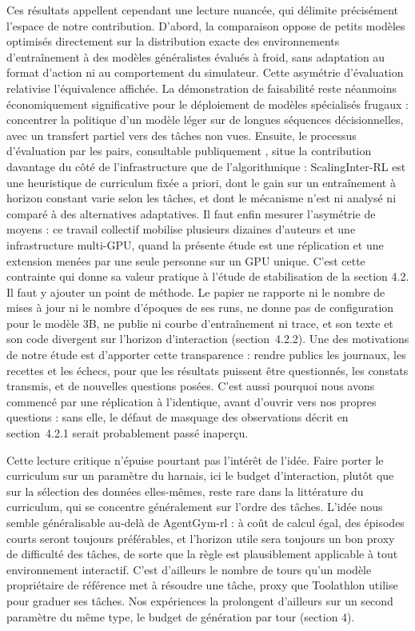 \documentclass[11pt,a4paper]{article}
\begin{document}
Ces résultats appellent cependant une lecture nuancée, qui délimite précisément l'espace de notre contribution. D'abord, la comparaison oppose de petits modèles optimisés directement sur la distribution exacte des environnements d'entraînement à des modèles généralistes évalués à froid, sans adaptation au format d'action ni au comportement du simulateur. Cette asymétrie d'évaluation relativise l'équivalence affichée. La démonstration de faisabilité reste néanmoins économiquement significative pour le déploiement de modèles spécialisés frugaux : concentrer la politique d'un modèle léger sur de longues séquences décisionnelles, avec un transfert partiel vers des tâches non vues. Ensuite, le processus d'évaluation par les pairs, consultable publiquement \cite{xi_agentgymrl_openreview}, situe la contribution davantage du côté de l'infrastructure que de l'algorithmique : ScalingInter-RL est une heuristique de curriculum fixée a priori, dont le gain sur un entraînement à horizon constant varie selon les tâches, et dont le mécanisme n'est ni analysé ni comparé à des alternatives adaptatives. Il faut enfin mesurer l'asymétrie de moyens : ce travail collectif mobilise plusieurs dizaines d'auteurs et une infrastructure multi-GPU, quand la présente étude est une réplication et une extension menées par une seule personne sur un GPU unique. C'est cette contrainte qui donne sa valeur pratique à l'étude de stabilisation de la section 4.2. Il faut y ajouter un point de méthode. Le papier ne rapporte ni le nombre de mises à jour ni le nombre d'époques de ses runs, ne donne pas de configuration pour le modèle 3B, ne publie ni courbe d'entraînement ni trace, et son texte et son code divergent sur l'horizon d'interaction (section~4.2.2). Une des motivations de notre étude est d'apporter cette transparence : rendre publics les journaux, les recettes et les échecs, pour que les résultats puissent être questionnés, les constats transmis, et de nouvelles questions posées. C'est aussi pourquoi nous avons commencé par une réplication à l'identique, avant d'ouvrir vers nos propres questions : sans elle, le défaut de masquage des observations décrit en section~4.2.1 serait probablement passé inaperçu.


Cette lecture critique n'épuise pourtant pas l'intérêt de l'idée. Faire porter le curriculum sur un paramètre du harnais, ici le budget d'interaction, plutôt que sur la sélection des données elles-mêmes, reste rare dans la littérature du curriculum, qui se concentre généralement sur l'ordre des tâches. L'idée nous semble généralisable au-delà de AgentGym-rl : à coût de calcul égal, des épisodes courts seront toujours préférables, et l'horizon utile sera toujours un bon proxy de difficulté des tâches, de sorte que la règle est plausiblement applicable à tout environnement interactif. C'est d'ailleurs le nombre de tours qu'un modèle propriétaire de référence met à résoudre une tâche, proxy que Toolathlon utilise pour graduer ses tâches. Nos expériences la prolongent d'ailleurs sur un second paramètre du même type, le budget de génération par tour (section 4).
\end{document}
